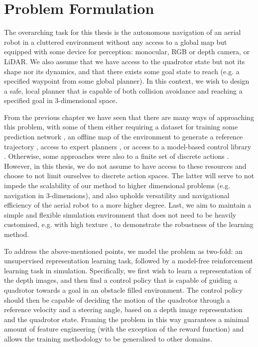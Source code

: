 \chapter{Problem Formulation}
\label{chap:4_problem_formulation}

The overarching task for this thesis is the autonomous navigation of an aerial robot in a cluttered environment without any access to a global map but equipped with some device for perception: monocular, RGB or depth camera, or LiDAR. We also assume that we have access to the quadrotor state but not its shape nor its dynamics, and that there exists some goal state to reach (e.g. a specified waypoint from some global planner). In this context, we wish to design a safe, local planner that is capable of both collision avoidance and reaching a specified goal in 3-dimensional space.

From the previous chapter we have seen that there are many ways of approaching this problem, with some of them either requiring a dataset for training some prediction network \cite{dronet}, an offline map of the environment to generate a reference trajectory \cite{supervised_DeepDroneRacing}, access to expert planners \cite{highSpeedObstacleAvoidanceMonocularVision2005, HighSpeedFlightWild}, or access to a model-based control library \cite{deepCollisionPredictorOracle}. Otherwise, some approaches were also to a finite set of discrete actions \cite{learning_to_fly_by_crashing, highSpeedObstacleAvoidanceMonocularVision2005, TowardsMonocularVisionObstacleAvoidanceDeepRL2017}.
However, in this thesis, we do not assume to have access to these resources and choose to not limit ourselves to discrete action spaces. The latter will serve to not impede the scalability of our method to higher dimensional problems (e.g. navigation in 3-dimensions), and also upholds versatility and navigational efficiency of the aerial robot to a more higher degree. 
Last, we aim to maintain a simple and flexible simulation environment that does not need to be heavily customised, e.g. with high texture \cite{cad2rl, HighSpeedFlightWild}, to demonstrate the robustness of the learning method.

To address the above-mentioned points, we model the problem as two-fold: an unsupervised representation learning task, followed by a model-free reinforcement learning task in simulation. 
Specifically, we first wish to learn a representation of the depth images, and then find a control policy that is capable of guiding a quadrotor towards a goal in an obstacle filled environment. The control policy should then be capable of deciding the motion of the quadrotor through a reference velocity and a steering angle, based on a depth image representation and the quadrotor state. 
Framing the problem in this way guarantees a minimal amount of feature engineering (with the exception of the reward function) and allows the training methodology to be generalised to other domains.


